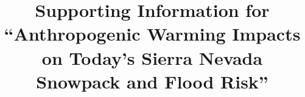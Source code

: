 \documentclass[grl]{agutexSI}
\begin{document}
%
%




\title{Supporting Information for ``Anthropogenic Warming Impacts on Today's Sierra Nevada Snowpack and Flood Risk''}

%
%

%
\end{document}
